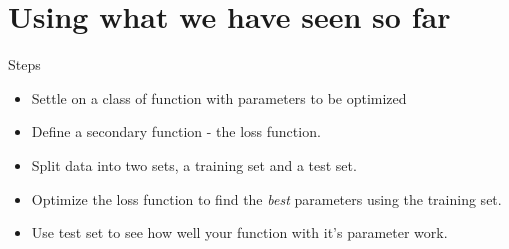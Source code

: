 \section{Using what we have seen so far}
\begin{frame}{Steps}
	\begin{itemize}
		\item<1> Settle on a class of function with parameters to be optimized
		 
		\item<-2> Define a secondary function - the loss function. 
		 
		\item<-3> Split data into two sets, a training set and a test set. 
	  
		\item<-4> Optimize the loss function  to find the {\it best} parameters using 
		the training set. 
		
		\item<-5> Use test set to see how well your function with it's parameter work.
	\end{itemize}
\end{frame}